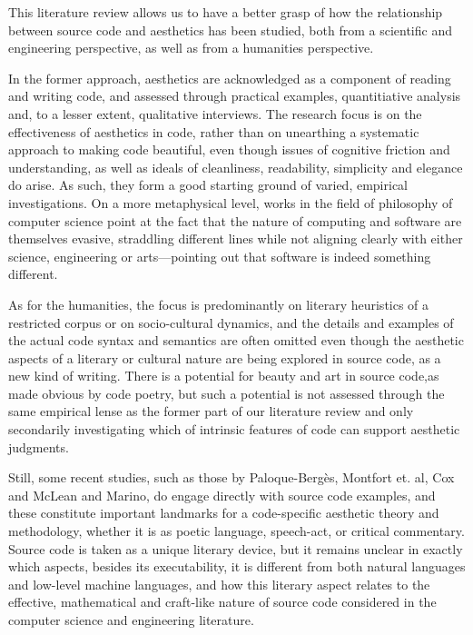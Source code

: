 \vspace{1\baselineskip}

This literature review allows us to have a better grasp of how the relationship between source code and aesthetics has been studied, both from a scientific and engineering perspective, as well as from a humanities perspective.

In the former approach, aesthetics are acknowledged as a component of reading and writing code, and assessed through practical examples, quantitiative analysis and, to a lesser extent, qualitative interviews. The research focus is on the effectiveness of aesthetics in code, rather than on unearthing a systematic approach to making code beautiful, even though issues of cognitive friction and understanding, as well as ideals of cleanliness, readability, simplicity and elegance do arise. As such, they form a good starting ground of varied, empirical investigations.
On a more metaphysical level, works in the field of philosophy of computer science point at the fact that the nature of computing and software are themselves evasive, straddling different lines while not aligning clearly with either science, engineering or arts—pointing out that software is indeed something different.

As for the humanities, the focus is predominantly on literary heuristics of a restricted corpus or on socio-cultural dynamics, and the details and examples of the actual code syntax and semantics are often omitted even though the aesthetic aspects of a literary or cultural nature are being explored in source code, as a new kind of writing. There is a potential for beauty and art in source code,as made obvious by code poetry, but such a potential is not assessed through the same empirical lense as the former part of our literature review and only secondarily investigating which of intrinsic features of code can support aesthetic judgments.

Still, some recent studies, such as those by Paloque-Bergès, Montfort et. al, Cox and McLean and Marino, do engage directly with source code examples, and these constitute important landmarks for a code-specific aesthetic theory and methodology, whether it is as poetic language, speech-act, or critical commentary. Source code is taken as a unique literary device, but it remains unclear in exactly which aspects, besides its executability, it is different from both natural languages and low-level machine languages, and how this literary aspect relates to the effective, mathematical and craft-like nature of source code considered in the computer science and engineering literature.

